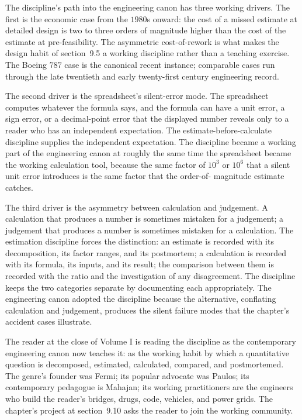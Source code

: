 The discipline's path into the engineering canon has three
working drivers. The first is the economic case from the
$1980$s onward: the cost of a missed estimate at detailed
design is two to three orders of magnitude higher than the
cost of the estimate at pre-feasibility. The asymmetric
cost-of-rework is what makes the design habit of
section~9.5 a working discipline rather than a teaching
exercise. The Boeing $787$ case is the canonical recent
instance; comparable cases run through the late twentieth
and early twenty-first century engineering record.

The second driver is the spreadsheet's silent-error mode.
The spreadsheet computes whatever the formula says, and the
formula can have a unit error, a sign error, or a
decimal-point error that the displayed number reveals only
to a reader who has an independent expectation. The
estimate-before-calculate discipline supplies the
independent expectation. The discipline became a working
part of the engineering canon at roughly the same time the
spreadsheet became the working calculation tool, because
the same factor of $10^{3}$ or $10^{6}$ that a silent unit
error introduces is the same factor that the order-of-
magnitude estimate catches.

The third driver is the asymmetry between calculation and
judgement. A calculation that produces a number is
sometimes mistaken for a judgement; a judgement that
produces a number is sometimes mistaken for a calculation.
The estimation discipline forces the distinction: an
estimate is recorded with its decomposition, its factor
ranges, and its postmortem; a calculation is recorded with
its formula, its inputs, and its result; the comparison
between them is recorded with the ratio and the
investigation of any disagreement. The discipline keeps
the two categories separate by documenting each
appropriately. The engineering canon adopted the discipline
because the alternative, conflating calculation and
judgement, produces the silent failure modes that the
chapter's accident cases illustrate.

The reader at the close of Volume I is reading the
discipline as the contemporary engineering canon now
teaches it: as the working habit by which a quantitative
question is decomposed, estimated, calculated, compared,
and postmortemed. The genre's founder was Fermi; its
popular advocate was Paulos; its contemporary pedagogue is
Mahajan; its working practitioners are the engineers who
build the reader's bridges, drugs, code, vehicles, and
power grids. The chapter's project at section~9.10 asks the
reader to join the working community.

